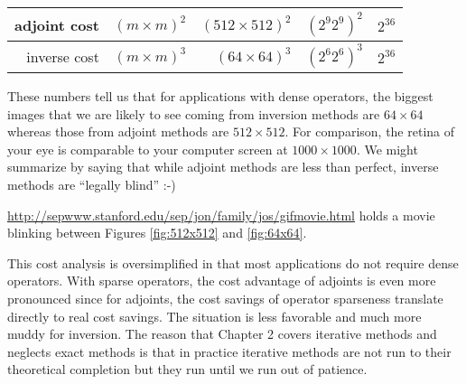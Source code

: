 \par
\begin{center}
\begin{tabular}{||r|r|r|r|r||}                                          \hline
adjoint cost &$(m\times m )^2$ & $(512\times 512)^2$ & $(2^9 2^9)^2$ & $2^{36}$
\\ \hline
inverse cost &$(m\times m )^3$ & $  (64\times 64)^3$ & $(2^6 2^6)^3$ & $2^{36}$
\\ \hline
\end{tabular}

\end{center}

\par\noindent
These numbers tell us that for applications with dense operators,
the biggest images that we are likely to see coming from inversion methods
are $64\times 64$ whereas those from adjoint methods are $512\times 512$.
For comparison, the retina of your eye is comparable to your computer
screen at $1000\times 1000$.
We might summarize by saying that while adjoint methods are less than perfect,
inverse methods are ``legally blind'' :-)
\par\noindent
\url{http://sepwww.stanford.edu/sep/jon/family/jos/gifmovie.html} holds a movie
blinking between Figures \ref{fig:512x512} and \ref{fig:64x64}.



\par
This cost analysis is oversimplified in that most applications
do not require dense operators.
With sparse operators, the cost advantage of adjoints is even more
pronounced since for adjoints,
the cost savings of operator sparseness translate directly to
real cost savings.
The situation is less favorable and much more muddy for inversion.
The reason that Chapter 2 covers iterative methods
and neglects exact methods is that in practice
iterative methods are not run to their theoretical completion
but they run until we run out of patience.

